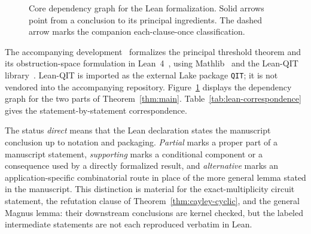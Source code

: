 \documentclass[11pt]{article}
\theoremstyle{definition}
\theoremstyle{remark}
\numberwithin{equation}{section}
\begin{document}
\begin{figure}[h]
{%
}
\caption{Core dependency graph for the Lean formalization.  Solid arrows
point from a conclusion to its principal ingredients.  The dashed arrow
marks the companion each-clause-once classification.}
\label{fig:lean-dependencies}
\end{figure}

The accompanying development~\cite{FourPlayerXORGames2026} formalizes the
principal threshold theorem and its obstruction-space formulation in
Lean~4~\cite{deMouraUllrich2021}, using Mathlib~\cite{mathlib2020} and the
Lean-QIT library~\cite{ZhuEtAl2026LeanQIT}.  Lean-QIT is imported as the
external Lake package \texttt{QIT}; it is not vendored into the accompanying
repository.  Figure~\ref{fig:lean-dependencies} displays the dependency graph
for the two parts of Theorem~\ref{thm:main}.  Table~\ref{tab:lean-correspondence}
gives the statement-by-statement correspondence.

The status \emph{direct} means that the Lean declaration states the
manuscript conclusion up to notation and packaging.  \emph{Partial} marks a
proper part of a manuscript statement, \emph{supporting} marks a conditional
component or a consequence used by a directly formalized result, and
\emph{alternative} marks an application-specific combinatorial route in place
of the more general lemma stated in the manuscript.  This distinction is
material for the exact-multiplicity circuit statement, the refutation clause
of Theorem~\ref{thm:cayley-cyclic}, and the general Magnus lemma: their
downstream conclusions are kernel checked, but the labeled intermediate
statements are not each reproduced verbatim in Lean.
\end{document}
